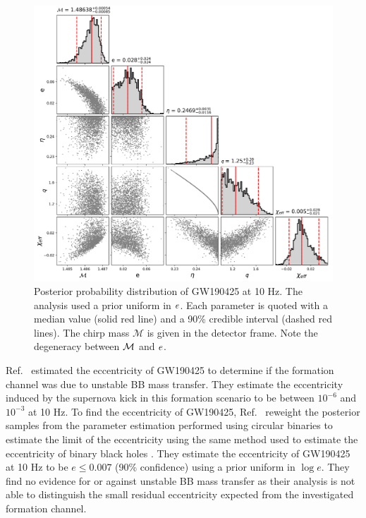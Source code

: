 \begin{figure}
    \includegraphics[width=\textwidth]{Figures/bns-pe/GW190425-e10.png}
    \caption{Posterior probability distribution of GW190425 at 10 Hz. The analysis used a prior uniform in $e$. Each parameter is quoted with a median value (solid red line) and a 90\% credible interval (dashed red lines). The chirp mass $\mathcal{M}$ is given in the detector frame. Note the degeneracy between $\mathcal{M}$ and $e$.}
\label{Fig:GW190425}
\end{figure}

Ref.~\cite{10.1093/mnrasl/slaa084} estimated the eccentricity of GW190425 to determine if the formation channel was due to unstable BB mass transfer. They estimate the eccentricity induced by the supernova kick in this formation scenario to be between $10^{-6}$ and $10^{-3}$ at 10 Hz. To find the eccentricity of GW190425, Ref.~\cite{10.1093/mnrasl/slaa084} reweight the posterior samples from the parameter estimation performed using circular binaries to estimate the limit of the eccentricity using the same method used to estimate the eccentricity of binary black holes \cite{Romero-Shaw:2019itr}. They estimate the eccentricity of GW190425 at 10 Hz to be $e \leq 0.007$ (90\% confidence) using a prior uniform in $\log e$. They find no evidence for or against unstable BB mass transfer as their analysis is not able to distinguish the small residual eccentricity expected from the investigated formation channel. 

